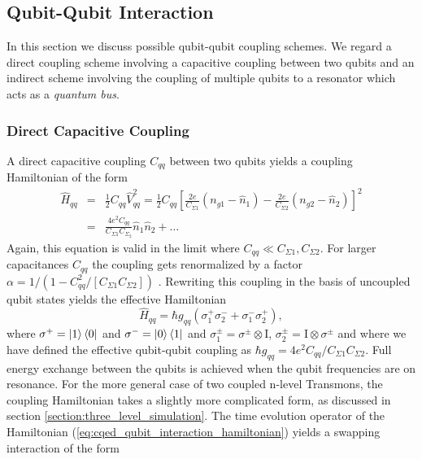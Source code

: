\subsection{Qubit-Qubit Interaction}

In this section we discuss possible qubit-qubit coupling schemes. We regard a direct coupling scheme involving a capacitive coupling between two qubits and an indirect scheme involving the coupling of multiple qubits to a resonator which acts as a {\it quantum bus}.

\subsubsection{Direct Capacitive Coupling}

A direct capacitive coupling $C_{qq}$ between two qubits yields a coupling Hamiltonian of the form
%
\begin{eqnarray}
\hat{H}_{qq} & = & \frac{1}{2}C_{qq}\hat{V}_{qq}^2 = \frac{1}{2}C_{qq}\left[\frac{2e}{C_{\Sigma 1}}(n_{g1}-\hat{n}_1)-\frac{2e}{C_{\Sigma 2}}(n_{g2}-\hat{n}_2)\right]^2 \\
& = & \frac{4e^2 C_{qq}}{C_{\Sigma 1}C_{\Sigma_2}}\hat{n}_1\hat{n}_2+\hdots \label{eq:cqed_capacitive_coupling}
\end{eqnarray}
%
Again, this equation is valid in the limit where $C_{qq} \ll C_{\Sigma 1},C_{\Sigma 2}$. For larger capacitances $C_{qq}$ the coupling gets renormalized by a factor $\alpha = 1/(1-C_{qq}^2/[C_{\Sigma 1}C_{\Sigma 2}])$ \citep{nguyen_cooper_2008}. Rewriting this coupling in the basis of uncoupled qubit states yields the effective Hamiltonian
%
\begin{equation}
\hat{H}_{qq} = \hbar g_{qq}\left(\sigma^+_1\sigma^-_2+\sigma^-_1\sigma^+_2\right), \label{eq:cqed_qubit_interaction_hamiltonian}
\end{equation}
%
where $\sigma^+=\left| 1 \right>\left< 0 \right|$ and $\sigma^-=\left| 0 \right>\left< 1 \right|$ and $\sigma_1^\pm=\sigma^\pm\otimes \mathrm{I}$, $\sigma_2^\pm = \mathrm{I}\otimes \sigma^\pm$ and where we have defined the effective qubit-qubit coupling as $\hbar g_{qq} = 4e^2 C_{qq}/C_{\Sigma 1}C_{\Sigma 2}$. Full energy exchange between the qubits is achieved when the qubit frequencies are on resonance. For the more general case of two coupled n-level Transmons, the coupling Hamiltonian takes a slightly more complicated form, as discussed in section \ref{section:three_level_simulation}. The time evolution operator of the Hamiltonian (\ref{eq:cqed_qubit_interaction_hamiltonian}) yields a swapping interaction of the form
